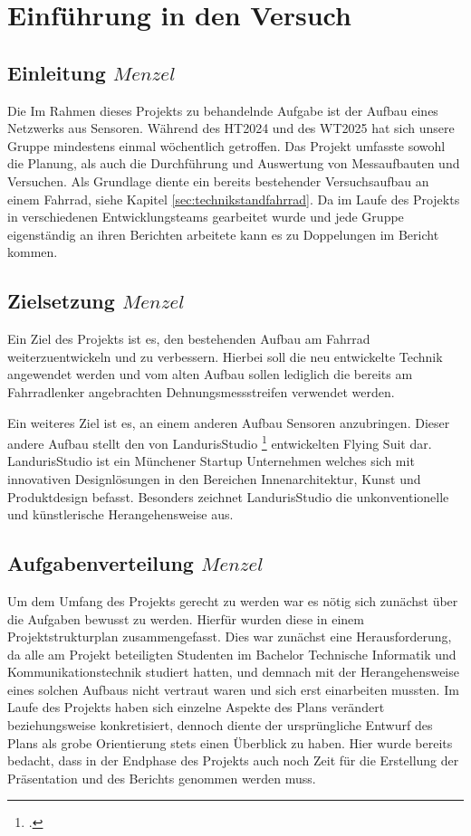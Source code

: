 \chapter{Einführung in den Versuch}
\label{cha:einfuehrung}
\todo{}
\section{Einleitung \(Menzel\)}

Die Im Rahmen dieses Projekts zu behandelnde Aufgabe ist der Aufbau eines Netzwerks aus Sensoren.
Während des HT2024 und des WT2025 hat sich unsere Gruppe mindestens einmal wöchentlich getroffen.
Das Projekt umfasste sowohl die Planung, als auch die Durchführung und Auswertung von Messaufbauten und Versuchen.
Als Grundlage diente ein bereits bestehender Versuchsaufbau an einem Fahrrad, siehe Kapitel \ref{sec:technikstandfahrrad}.
Da im Laufe des Projekts in verschiedenen Entwicklungsteams gearbeitet wurde und jede Gruppe eigenständig an ihren Berichten arbeitete kann es zu Doppelungen im Bericht kommen.

\section{Zielsetzung \(Menzel\)}
Ein Ziel des Projekts ist es, den bestehenden Aufbau am Fahrrad weiterzuentwickeln und zu verbessern.
Hierbei soll die neu entwickelte Technik angewendet werden und vom alten Aufbau sollen lediglich die bereits am Fahrradlenker angebrachten Dehnungsmessstreifen verwendet werden.

Ein weiteres Ziel ist es, an einem anderen Aufbau Sensoren anzubringen.
Dieser andere Aufbau stellt den von LandurisStudio \footcite{https://www.landuris.com/} entwickelten Flying Suit dar.
LandurisStudio ist ein Münchener Startup Unternehmen welches sich mit innovativen Designlösungen in den Bereichen Innenarchitektur, Kunst und Produktdesign befasst.
Besonders zeichnet LandurisStudio die unkonventionelle und künstlerische Herangehensweise aus.


\newpage
\section{Aufgabenverteilung \(Menzel\)}
Um dem Umfang des Projekts gerecht zu werden war es nötig sich zunächst über die Aufgaben bewusst zu werden.
Hierfür wurden diese in einem Projektstrukturplan zusammengefasst. Dies war zunächst eine Herausforderung, da alle am Projekt beteiligten Studenten im Bachelor Technische Informatik und Kommunikationstechnik studiert hatten,
und demnach mit der Herangehensweise eines solchen Aufbaus nicht vertraut waren und sich erst einarbeiten mussten.
Im Laufe des Projekts haben sich einzelne Aspekte des Plans verändert beziehungsweise konkretisiert, dennoch diente der ursprüngliche Entwurf des Plans als grobe Orientierung stets einen Überblick zu haben.
Hier wurde bereits bedacht, dass in der Endphase des Projekts auch noch Zeit für die Erstellung der Präsentation und des Berichts genommen werden muss.

